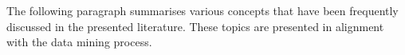 The following paragraph summarises various concepts that have been frequently discussed in the presented literature. These topics are presented in alignment with the data mining process.  \\

